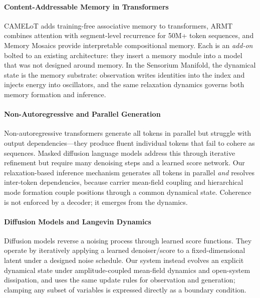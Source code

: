 \documentclass[11pt,a4paper]{article}
\begin{document}
\paragraph{Content-Addressable Memory in Transformers}
CAMELoT \citep{liu2024camelot} adds training-free associative memory to transformers, ARMT \citep{bulatov2024armt} combines attention with segment-level recurrence for 50M+ token sequences, and Memory Mosaics \citep{liu2024memorymosaics} provide interpretable compositional memory. Each is an \emph{add-on} bolted to an existing architecture: they insert a memory module into a model that was not designed around memory. In the Sensorium Manifold, the dynamical state is the memory substrate: observation writes identities into the index and injects energy into oscillators, and the same relaxation dynamics governs both memory formation and inference.

\paragraph{Non-Autoregressive and Parallel Generation}
Non-autoregressive transformers \citep{gu2018nonautoregressive} generate all tokens in parallel but struggle with output dependencies---they produce fluent individual tokens that fail to cohere as sequences. Masked diffusion language models \citep{sahoo2024mdlm, nie2024scaling} address this through iterative refinement but require many denoising steps and a learned score network. Our relaxation-based inference mechanism generates all tokens in parallel \emph{and} resolves inter-token dependencies, because carrier mean-field coupling and hierarchical mode formation couple positions through a common dynamical state. Coherence is not enforced by a decoder; it emerges from the dynamics.

\paragraph{Diffusion Models and Langevin Dynamics}
Diffusion models \citep{sohl2015deep, ho2020denoising, song2021score} reverse a noising process through learned score functions. They operate by iteratively applying a learned denoiser/score to a fixed-dimensional latent under a designed noise schedule. Our system instead evolves an explicit dynamical state under amplitude-coupled mean-field dynamics and open-system dissipation, and uses the same update rules for observation and generation; clamping any subset of variables is expressed directly as a boundary condition.
\end{document}

